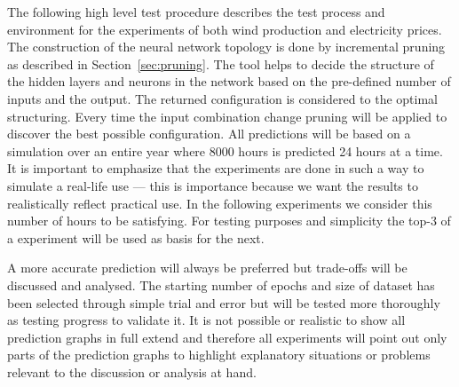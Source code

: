 The following high level test procedure describes the test process and environment for the experiments of both wind production and electricity prices. 
\\[0.5cm]
The construction of the neural network topology is done by incremental pruning as described in Section~\ref{sec:pruning}. The tool helps to decide the structure of the hidden layers and neurons in the network based on the pre-defined number of inputs and the output. The returned configuration is considered to the optimal structuring. Every time the input combination change pruning will be applied to discover the best possible configuration. All predictions will be based on a simulation over an entire year where 8000 hours is predicted 24 hours at a time. It is important to emphasize that the experiments are done in such a way to simulate a real-life use --- this is importance because we want the results to realistically reflect practical use. In the following experiments we consider this number of hours to be satisfying. For testing purposes and simplicity the top-3 of a experiment will be used as basis for the next. 

A more accurate prediction will always be preferred but trade-offs will be discussed and analysed. The starting number of epochs and size of dataset has been selected through simple trial and error but will be tested more thoroughly as testing progress to validate it. It is not possible or realistic to show all prediction graphs in full extend and therefore all experiments will point out only parts of the prediction graphs to highlight explanatory situations or problems relevant to the discussion or analysis at hand.     


